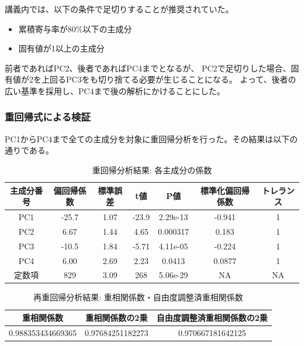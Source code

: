 \documentclass[11pt,a4paper, uplatex]{jsarticle}
\begin{document}
講義内では、以下の条件で足切りすることが推奨されていた。

\begin{itemize}
  \item 累積寄与率が80\%以下の主成分
  \item 固有値が1以上の主成分
\end{itemize}

前者であればPC2、後者であればPC4までとなるが、
PC2で足切りした場合、固有値が2を上回るPC3をも切り捨てる必要が生じることになる。
よって、後者の広い基準を採用し、PC4まで後の解析にかけることにした。

\subsubsection{重回帰式による検証}
PC1からPC4まで全ての主成分を対象に重回帰分析を行った。その結果は以下の通りである。

\begin{table}[htbp]
  \begin{center}
    \caption{重回帰分析結果: 各主成分の係数}
    \begin{tabular}{c|c|c|c|c|c|c}
      \hline
      主成分番号 & 偏回帰係数 & 標準誤差 & t値 & P値 & 標準化偏回帰係数 & トレランス \\ \hline \hline
      PC1 & -25.7 & 1.07 & -23.9 & 2.29e-13 & -0.941 & 1 \\
      PC2 & 6.67 & 1.44 & 4.65 & 0.000317 & 0.183 & 1 \\
      PC3 & -10.5 & 1.84 & -5.71 & 4.11e-05 & -0.224 & 1 \\
      PC4 & 6.00 & 2.69 & 2.23 & 0.0413 & 0.0877 & 1 \\
      定数項 & 829 & 3.09 & 268 & 5.06e-29 & NA & NA \\
    \end{tabular}
    \label{tb:allone}
  \end{center}
\end{table}

\begin{table}[htbp]
  \begin{center}
    \caption{再重回帰分析結果: 重相関係数・自由度調整済重相関係数}
    \begin{tabular}{c|c|c}
      \hline
      重相関係数 & 重相関係数の2乗 & 自由度調整済重相関係数の2乗 \\ \hline \hline
      0.988353434669365 & 0.97684251182273 & 0.970667181642125
    \end{tabular}
    \label{Rs}
  \end{center}
\end{table}
\end{document}
